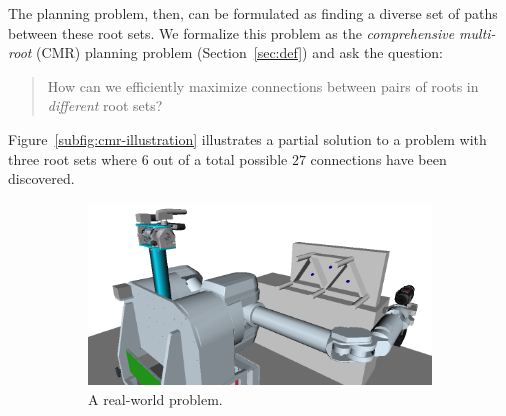 \documentclass{report}
\begin{document}
The planning problem, then,
can be formulated as finding a diverse set of paths between these
root sets.
We formalize this problem as the \emph{comprehensive multi-root} (CMR)
planning problem (Section~\ref{sec:def}) and ask the question: 
\begin{quote}
How can we efficiently maximize connections between pairs of roots
in \emph{different} root sets?
\end{quote}
Figure~\ref{subfig:cmr-illustration} illustrates a partial solution
to a problem with three root sets where $6$
out of a total possible $27$ connections have been discovered.

\begin{figure}[t]
\centering
\begin{subfigure}[b]{0.6\linewidth}
\centering
\includegraphics[width=\linewidth]{figs/herb-drilling.png}
\caption{A real-world problem.}
\label{subfig:herb-picture}
\end{subfigure}
\begin{subfigure}[b]{0.35\linewidth}
\centering
{}
\end{subfigure}
\end{figure}
\end{document}
